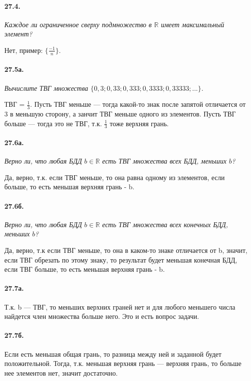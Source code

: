 \documentclass{book}
\begin{document}
\paragraph{27.4.}
\textit{Каждое ли ограниченное сверху подмножество в $\mathbb{R}$ имеет максимальный элемент?}

Нет, пример: $\{\frac{-1}{n}\}$.

\paragraph{27.5а.}
\textit{Вычислите ТВГ множества $\{0,3; 0,33; 0,333; 0,3333; 0,33333; . . .\}$.}

ТВГ = $\frac{1}{3}$. Пусть ТВГ меньше — тогда какой-то знак после запятой отличается от 3 в меньшую сторону, а занчит ТВГ меньше одного из элементов. Пусть ТВГ больше — тогда это не ТВГ, т.к. $\frac{1}{3}$ тоже верхняя грань.

\paragraph{27.6а.}
\textit{Верно ли, что любая БДД $b \in \mathbb{R}$ есть ТВГ множества всех БДД, меньших $b$?}

Да, верно, т.к. если ТВГ меньше, то она равна одному из элементов, если больше, то есть меньшая верхняя грань - b. 

\paragraph{27.6б.}
\textit{Верно ли, что любая БДД $b \in \mathbb{R}$ есть ТВГ множества всех конечных БДД, меньших $b$?}

Да, верно, т.к если ТВГ меньше, то она в каком-то знаке отличается от b, значит, если ТВГ  обрезать по этому знаку, то результат будет меньшая конечная БДД, если ТВГ больше, то есть меньшая верхняя грань - b.

\paragraph{27.7а.}
Т.к. b — ТВГ, то меньших верхних граней нет и для любого меньшего числа найдется член множества больше него. Это и есть вопрос задачи.

\paragraph{27.7б.}
Если есть меньшая общая грань, то разница между ней и заданной будет положительной. Тогда, т.к. меньшая верхняя грань — верхняя грань, то больше нее элементов нет, значит достаточно.
\end{document}

